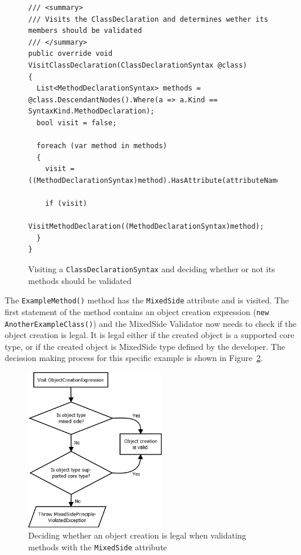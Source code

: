 \begin{figure}[H]
	\begin{lstlisting}[language=CSharp,classoffset=1,morekeywords={ClassDeclarationSyntax,SyntaxKind,MethodDeclarationSyntax,List}]
/// <summary>
/// Visits the ClassDeclaration and determines wether its members should be validated
/// </summary>
public override void VisitClassDeclaration(ClassDeclarationSyntax @class)
{
  List<MethodDeclarationSyntax> methods = @class.DescendantNodes().Where(a => a.Kind == SyntaxKind.MethodDeclaration);
  bool visit = false;

  foreach (var method in methods)
  {
    visit = ((MethodDeclarationSyntax)method).HasAttribute(attributeName);

    if (visit)
      VisitMethodDeclaration((MethodDeclarationSyntax)method);
  }
}
	\end{lstlisting}
	\caption{Visiting a \texttt{ClassDeclarationSyntax} and deciding whether or not its methods should be validated}
	\label{fig:ValidatorVisitClassDeclaration}
\end{figure}


The \texttt{ExampleMethod()} method has the \texttt{MixedSide} attribute and is visited. The first statement of the method contains an object creation expression (\texttt{new AnotherExampleClass()}) and the MixedSide Validator now needs to check if the object creation is legal. It is legal either if the created object is a supported core type, or if the created object is MixedSide type defined by the developer. The decission making process for this specific example is shown in Figure~\ref{fig:isobjectcreationvalid}.

\begin{figure}[H]
	\begin{center}
		\includegraphics[width=6cm]{resources/images/ValidationFlowchart.png}
		\caption{Deciding whether an object creation is legal when validating methods with the \texttt{MixedSide} attribute}
		\label{fig:isobjectcreationvalid}
	\end{center}
\end{figure}


